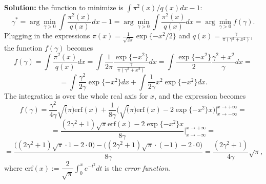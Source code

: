 \documentclass{article}
\begin{document}
\textbf{Solution:} the function to minimize is $ \int\pi^2(x)/q(x)dx -1 $:
\begin{equation}
\gamma^* = \arg\min_{\gamma>0} \int\frac{\pi^2(x)}{q(x)}dx -1 = \arg\min_{\gamma>0} \int\frac{\pi^2(x)}{q(x)}dx = \arg\min_{\gamma>0} f(\gamma).
\end{equation}
Plugging in the expressions $\pi(x) = \frac{1}{\sqrt{2\pi}}\exp\{-x^2/2\}$ and $q(x)=\frac{\gamma}{\pi(\gamma^2+x^2)}$, the function $f(\gamma)$ becomes
	\begin{equation}
		f(\gamma) = \int\frac{\pi^2(x)}{q(x)}dx = \int \frac{1}{2\pi}\frac{\exp\{-x^2\}}{\frac{\gamma}{\pi(\gamma^2+x^2)}}dx = \int \frac{\exp\{-x^2\}}{2}\frac{\gamma^2+x^2}{\gamma} dx =
	\end{equation}
	\begin{equation}
		= \int \frac{\gamma^2}{2\gamma}\exp\{-x^2\}dx + \int \frac{1}{2\gamma}x^2\exp\{-x^2\}dx.
	\end{equation}
The integration is over the whole real axis for $x$, and the expression becomes
	\begin{equation}
		f(\gamma)=\dfrac{\gamma^2}{4\gamma}\sqrt(\pi)\text{erf}(x) + \dfrac{1}{8\gamma}\Big(\sqrt(\pi)\text{erf}(x)-2\exp\{-x^2\}x\Big)\Bigg|_{x\rightarrow-\infty}^{x\rightarrow+\infty}=
	\end{equation}
	\begin{equation}
		=\dfrac{(2\gamma^2+1)\sqrt{\pi}\text{erf}(x)-2\exp\{-x^2\}x}{8\gamma}\Bigg|_{x\rightarrow-\infty}^{x\rightarrow+\infty} =
	\end{equation}
	\begin{equation}
		= \dfrac{\Big((2\gamma^2+1)\sqrt{\pi}\cdot 1 - 2\cdot 0\Big) - \Big((2\gamma^2+1)\sqrt{\pi}\cdot(-1) - 2\cdot 0\Big)}{8\gamma} = \dfrac{(2\gamma^2 +1 )}{4\gamma}\sqrt{\pi},
	\end{equation}
where $\text{erf}(x):= \dfrac{2}{\sqrt{\pi}}\int_{0}^{x}e^{-t^2}dt$ is the \textit{error function}.
\end{document}
